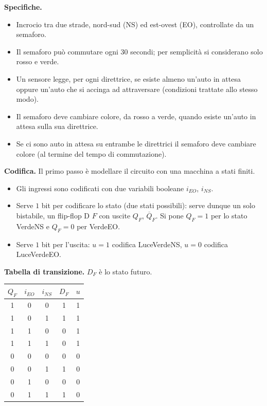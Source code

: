 \documentclass[11pt,a4paper]{article}
\begin{document}
\begin{esempio}
\textbf{Specifiche.}
\begin{itemize}
  \item Incrocio tra due strade, nord-sud (NS) ed est-ovest (EO), controllate da un semaforo.
  \item Il semaforo può commutare ogni $30$ secondi; per semplicità si considerano solo rosso e verde.
  \item Un sensore legge, per ogni direttrice, se esiste almeno un'auto in attesa oppure un'auto che si accinga ad attraversare (condizioni trattate allo stesso modo).
  \item Il semaforo deve cambiare colore, da rosso a verde, quando esiste un'auto in attesa sulla sua direttrice.
  \item Se ci sono auto in attesa su entrambe le direttrici il semaforo deve cambiare colore (al termine del tempo di commutazione).
\end{itemize}

\textbf{Codifica.} Il primo passo è modellare il circuito con una macchina a stati finiti.
\begin{itemize}
  \item Gli ingressi sono codificati con due variabili booleane $i_{EO}$, $i_{NS}$.
  \item Serve $1$ bit per codificare lo stato (due stati possibili): serve dunque un solo bistabile, un flip-flop D $F$ con uscite $Q_F$, $\overline{Q}_F$. Si pone $Q_F = 1$ per lo stato VerdeNS e $Q_F = 0$ per VerdeEO.
  \item Serve $1$ bit per l'uscita: $u = 1$ codifica LuceVerdeNS, $u = 0$ codifica LuceVerdeEO.
\end{itemize}

\textbf{Tabella di transizione.} $D_F$ è lo stato futuro.
\begin{center}
\begin{tabular}{c|cc|cc}
\toprule
$Q_F$ & $i_{EO}$ & $i_{NS}$ & $D_F$ & $u$ \\
\midrule
1 & 0 & 0 & 1 & 1 \\
1 & 0 & 1 & 1 & 1 \\
1 & 1 & 0 & 0 & 1 \\
1 & 1 & 1 & 0 & 1 \\
0 & 0 & 0 & 0 & 0 \\
0 & 0 & 1 & 1 & 0 \\
0 & 1 & 0 & 0 & 0 \\
0 & 1 & 1 & 1 & 0 \\
\bottomrule
\end{tabular}
\end{center}


\end{esempio}
\end{document}
